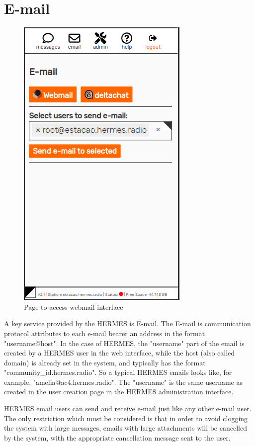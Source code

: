 \documentclass[11pt,a4paper]{article}
\begin{document}
\section{E-mail}
\label{email}

\begin{figure}[H]
    \centering
    \includegraphics[width=0.5\columnwidth]{screenshots/frontend/en/email.png}
    	\caption{Page to access webmail interface}
	\vspace{-10pt}
    \label{fig:webmail2}
\end{figure}

A key service provided by the HERMES is E-mail. The E-mail is communication protocol attributes to each e-mail bearer an address in the format "username@host". In the case of HERMES, the "username" part of the email is created by a HERMES user in the web interface, while the host (also called domain) is already set in the system, and typically has the format "community\_id.hermes.radio". So a typical HERMES emails looks like, for example, "amelia@ac4.hermes.radio". The "username" is the same username as created in the user creation page in the HERMES administration interface.

HERMES email users can send and receive e-mail just like any other e-mail user. The only restriction which must be considered is that in order to avoid clogging the system with large messages, emails with large attachments will be cancelled by the system, with the appropriate cancellation message sent to the user. %
\end{document}
